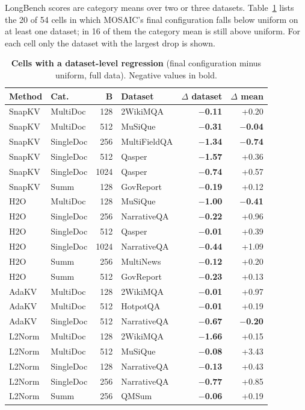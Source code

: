 LongBench scores are category means over two or three datasets. Table~\ref{tab:app-dataset-reg} lists the 20 of 54 cells in which MOSAIC's final configuration falls below uniform on at least one dataset; in 16 of them the category mean is still above uniform. For each cell only the dataset with the largest drop is shown.

\begin{table}[t]
  \centering
  \scriptsize
  \setlength{\tabcolsep}{3pt}
  \begin{tabular}{@{}l l r l r r@{}}
    \toprule
    Method & Cat. & B & Dataset & $\Delta$ dataset & $\Delta$ mean \\
    \midrule
    SnapKV & MultiDoc & 128 & 2WikiMQA & \textbf{$-$0.11} & +0.20 \\
    SnapKV & MultiDoc & 512 & MuSiQue & \textbf{$-$0.31} & \textbf{$-$0.04} \\
    SnapKV & SingleDoc & 256 & MultiFieldQA & \textbf{$-$1.34} & \textbf{$-$0.74} \\
    SnapKV & SingleDoc & 512 & Qasper & \textbf{$-$1.57} & +0.36 \\
    SnapKV & SingleDoc & 1024 & Qasper & \textbf{$-$0.74} & +0.57 \\
    SnapKV & Summ & 128 & GovReport & \textbf{$-$0.19} & +0.12 \\
    H2O & MultiDoc & 128 & MuSiQue & \textbf{$-$1.00} & \textbf{$-$0.41} \\
    H2O & SingleDoc & 256 & NarrativeQA & \textbf{$-$0.22} & +0.96 \\
    H2O & SingleDoc & 512 & Qasper & \textbf{$-$0.01} & +0.39 \\
    H2O & SingleDoc & 1024 & NarrativeQA & \textbf{$-$0.44} & +1.09 \\
    H2O & Summ & 256 & MultiNews & \textbf{$-$0.12} & +0.20 \\
    H2O & Summ & 512 & GovReport & \textbf{$-$0.23} & +0.13 \\
    AdaKV & MultiDoc & 128 & 2WikiMQA & \textbf{$-$0.01} & +0.97 \\
    AdaKV & MultiDoc & 512 & HotpotQA & \textbf{$-$0.01} & +0.19 \\
    AdaKV & SingleDoc & 512 & NarrativeQA & \textbf{$-$0.67} & \textbf{$-$0.20} \\
    L2Norm & MultiDoc & 128 & 2WikiMQA & \textbf{$-$1.66} & +0.15 \\
    L2Norm & MultiDoc & 512 & MuSiQue & \textbf{$-$0.08} & +3.43 \\
    L2Norm & SingleDoc & 128 & NarrativeQA & \textbf{$-$0.13} & +0.43 \\
    L2Norm & SingleDoc & 256 & NarrativeQA & \textbf{$-$0.77} & +0.85 \\
    L2Norm & Summ & 256 & QMSum & \textbf{$-$0.06} & +0.19 \\
    \bottomrule
  \end{tabular}
  \caption{\textbf{Cells with a dataset-level regression} (final configuration minus uniform, full data). Negative values in bold.}
  \label{tab:app-dataset-reg}
\end{table}


